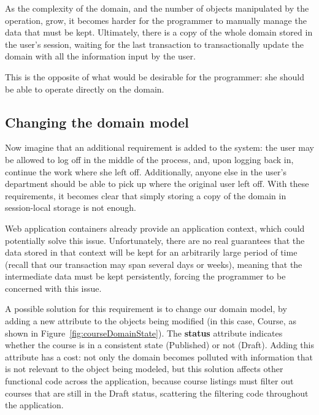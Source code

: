 As the complexity of the domain, and the number of objects manipulated
by the operation, grow, it becomes harder for the programmer to
manually manage the data that must be kept. Ultimately, there is a
copy of the whole domain stored in the user's session, waiting for the
last transaction to transactionally update the domain with all the
information input by the user.

This is the opposite of what would be desirable for the programmer:
she should be able to operate directly on the domain.

\subsection{Changing the domain model}

Now imagine that an additional requirement is added to the system: the
user may be allowed to log off in the middle of the process, and, upon
logging back in, continue the work where she left off. Additionally,
anyone else in the user's department should be able to pick up where
the original user left off. With these requirements, it becomes clear
that simply storing a copy of the domain in session-local storage is
not enough.

Web application containers already provide an application context,
which could potentially solve this issue. Unfortunately, there are no
real guarantees that the data stored in that context will be kept for
an arbitrarily large period of time (recall that our transaction may
span several days or weeks), meaning that the intermediate data must
be kept persistently, forcing the programmer to be concerned with this
issue.

A possible solution for this requirement is to change our domain
model, by adding a new attribute to the objects being modified (in
this case, Course, as shown in
Figure~\ref{fig:courseDomainState}). The {\bf status} attribute
indicates whether the course is in a consistent state (Published) or
not (Draft). Adding this attribute has a cost: not only the domain
becomes polluted with information that is not relevant to the object
being modeled, but this solution affects other functional code across
the application, because course listings must filter out courses that
are still in the Draft status, scattering the filtering code
throughout the application.


